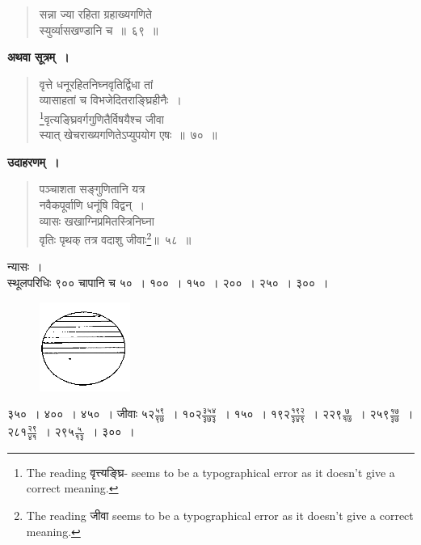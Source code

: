 \documentclass[11pt, openany]{book}
\begin{document}
\begin{quote}
    \bs 
 सन्ना ज्या रहिता ग्रहाख्यगणिते \\
 स्युर्व्यासखण्डानि च~॥~६९~॥
\end{quote}

\newpage%
\setcounter{footnote}{0}

\textbf{अथवा सूत्रम्~।} 

\begin{quote}
    \bs 
वृत्ते धनूरहितनिघ्नवृतिर्द्विधा तां \\
व्यासाहतां च विभजेदितराङ्घ्रिहीनैः~।\\
\footnote{The reading वृत्त्यङ्घ्रि- seems to be a typographical error as it doesn't give a correct meaning.}वृत्यङ्घ्रिवर्गगुणितैर्विषयैश्च जीवा \\
स्यात् खेचराख्यगणितेऽप्युपयोग एषः~॥~७०~॥
\end{quote}

 \textbf{उदाहरणम्~।} 
\begin{quote}
    \bqt 
पञ्चाशता सङ्गुणितानि यत्र \\
नवैकपूर्वाणि धनूंषि विद्वन्~।\\
व्यासः खखाग्निप्रमितस्त्रिनिघ्ना \\
वृतिः पृथक् तत्र वदाशु जीवाः\footnote{The reading जीवा seems to be a typographical error as it doesn't give a correct meaning.}॥~५८~॥
\end{quote}

न्यासः~। \\
 
 \vspace{-4mm}
 स्थूलपरिधिः ९०० चापानि च ५०~। १००~। १५०~। २००~। २५०~। ३००~। 
 \vspace{-2mm}

\begin{figure}[h!]
    \centering
    \includegraphics[scale=0.85]{graphics/capture82.png}
\end{figure}
 \vspace{-2mm}

\noindent ३५०~। ४००~। ४५०~। जीवाः $\mbox{५२}\frac{\mbox{५९}}{\mbox{९७}}$~। $\mbox{१०२}\frac{\mbox{३५४}}{\mbox{३७३}}$~। १५०~। $\mbox{१९२}\frac{\mbox{१९२}}{\mbox{३४९}}$~।
$\mbox{२२९}\frac{\mbox{७}}{\mbox{१७}}$~।
$\mbox{२५९}\frac{\mbox{१७}}{\mbox{३७}}$~।
$\mbox{२८१}\frac{\mbox{२९}}{\mbox{४१}}$~।
$\mbox{२९५}\frac{\mbox{५}}{\mbox{१३}}$~। ३००~।
\newpage
\setcounter{footnote}{0}
\end{document}
